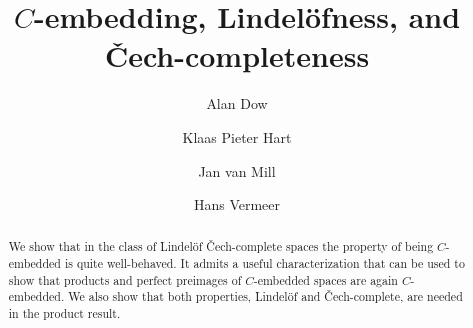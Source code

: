 \documentclass[a4paper]{amsart}
\theoremstyle{plain}
\theoremstyle{definition}
\theoremstyle{remark}
\begin{document}
\title{$C$-embedding, Lindel\"ofness, and \v{C}ech-completeness}

\author[A. Dow]{Alan Dow}
\address{Department of Mathematics\\
         UNC-Charlotte\\
         9201 University City Blvd. \\
         Charlotte, NC 28223-0001}

\author[K. P. Hart]{Klaas Pieter Hart}
\address{Faculty EEMCS\\TU Delft\\
         Postbus 5031\\2600~GA {} Delft\\the Netherlands}

\author[J. van Mill]{Jan van Mill}
\address{KdV Institute for Mathematics\\
         University of Amsterdam\\
         P.O. Box 94248\\
         1090~GE {} Amsterdam\\
         The Netherlands}

\author[J. Vermeer]{Hans Vermeer}
\address{Faculty EEMCS\\TU Delft\\
         Postbus 5031\\2600~GA {} Delft\\the Netherlands}



\begin{abstract}
We show that in the class of Lindel\"of \v{C}ech-complete spaces
the property of being $C$-embedded is quite well-behaved.
It admits a useful characterization that can be used to show that products
and perfect preimages of $C$-embedded spaces are again $C$-embedded.
We also show that both properties, Lindel\"of and \v{C}ech-complete,
are needed in the product result.
\end{abstract}


\date\filedate
\end{document}
